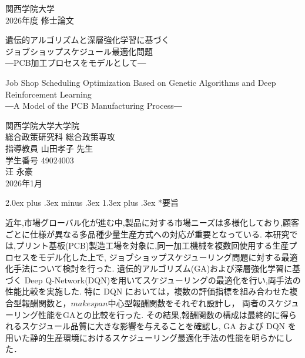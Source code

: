 \documentclass{jarticle}
\makeatletter
\newcommand{\BodyFont}{\fontsize{12pt}{18pt}\selectfont}
\renewcommand{\section}{%
  \@startsection{section}{1}{\z@}%
  {2.0ex plus .3ex minus .3ex}%
  {1.3ex plus .3ex}%
  {\huge\bfseries}%
}
\makeatother
\begin{document}
\begin{titlepage}
\centering
\vspace*{4cm}
{\LARGE 関西学院大学 \\ 2026年度 修士論文 \par}
\vspace{2cm}
{\Huge 遺伝的アルゴリズムと深層強化学習に基づく \\
ジョブショップスケジュール最適化問題 \\
―PCB加工プロセスをモデルとして―\par}
\vspace{1cm}
{Job Shop Scheduling Optimization Based on Genetic Algorithms and Deep Reinforcement Learning \\
―A Model of the PCB Manufacturing Process―\par}

\vspace{3cm}
{\Large
関西学院大学大学院 \\
総合政策研究科 総合政策専攻\\
指導教員 山田\hspace{1em}孝子 先生\\
\vspace{1cm}
学生番号 49024003\\
汪 永豪 \\
2026年1月
}
\end{titlepage}

\clearpage
\BodyFont 

\section*{\centering 要旨}
近年,市場グローバル化が進む中,製品に対する市場ニーズは多様化しており,顧客ごとに仕様が異なる多品種少量生産方式への対応が重要となっている.
本研究では,プリント基板(PCB)製造工場を対象に,同一加工機械を複数回使用する生産プロセスをモデル化した上で,
ジョブショップスケジューリング問題に対する最適化手法について検討を行った.
遺伝的アルゴリズム(GA)および深層強化学習に基づく Deep Q-Network(DQN)を用いてスケジューリングの最適化を行い,両手法の性能比較を実施した.
特に DQN においては，複数の評価指標を組み合わせた複合型報酬関数と，$makespan$中心型報酬関数をそれぞれ設計し，
両者のスケジューリング性能をGAとの比較を行った.
その結果,報酬関数の構成は最終的に得られるスケジュール品質に大きな影響を与えることを確認し,
GA および DQN を用いた静的生産環境におけるスケジューリング最適化手法の性能を明らかにした．\\
\end{document}
